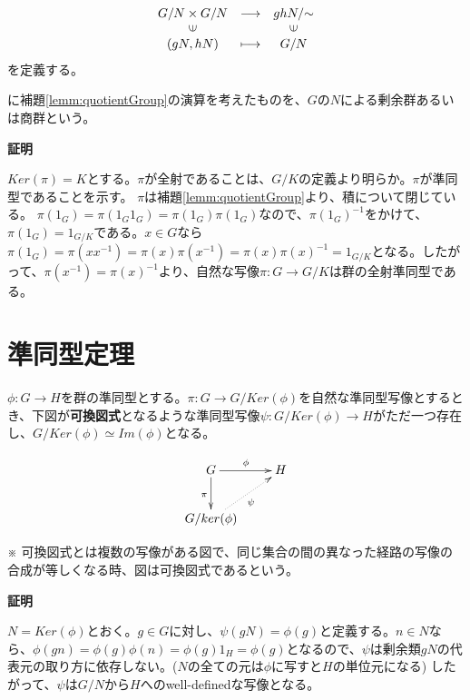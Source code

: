 \documentclass[dvipdfmx,autodetect-engine]{jsarticle}
\begin{document}
$$
\begin{array}{ccc}
G/N \times G/N & {\longrightarrow} & ghN/{\sim} \\
\rotatebox{90}{$\in$} & & \rotatebox{90}{$\in$} \\
(gN, hN) & \longmapsto & G/N
\end{array}
$$
を定義する。

に補題\ref{lemm:quotientGroup}の演算を考えたものを、$G$の$N$による剰余群あるいは商群という。

\label{prop:wellDefinedHom}

{\bf 証明}

$Ker(\pi) = K$とする。$\pi$が全射であることは、$G/K$の定義より明らか。$\pi$が準同型であることを示す。
$\pi$は補題\ref{lemm:quotientGroup}より、積について閉じている。 $\pi(1_G) = \pi(1_G1_G) = \pi(1_G)\pi(1_G)$なので、$\pi(1_G)^{-1}$をかけて、$\pi(1_G) = 1_{G/K}$である。$x \in G$なら$\pi(1_G) = \pi(xx^{-1}) = \pi(x)\pi(x^{-1}) = \pi(x)\pi(x)^{-1} = 1_{G/K}$となる。したがって、$\pi(x^{-1}) = \pi(x)^{-1}$より、自然な写像$\pi: G \to G/K$は群の全射準同型である。

\section{準同型定理}


$\phi: G \to H$を群の準同型とする。$\pi: G \to G/Ker(\phi)$を自然な準同型写像とするとき、下図が{\bf 可換図式}となるような準同型写像$\psi: G/Ker(\phi) \to H$がただ一つ存在し、$G/Ker(\phi) \simeq Im(\phi)$となる。

\[
\xymatrix{
G \ar[r]^{\phi} \ar[d]_{\pi} & H \\
G/ker(\phi) \ar@{.>}[ru]_{\psi}
}
\]

※ 可換図式とは複数の写像がある図で、同じ集合の間の異なった経路の写像の合成が等しくなる時、図は可換図式であるという。

{\bf 証明}


$N = Ker(\phi)$とおく。$g \in G$に対し、$\psi(gN) = \phi(g)$と定義する。$n \in N$なら、$\phi(gn) = \phi(g)\phi(n) = \phi(g)1_H = \phi(g)$となるので、$\psi$は剰余類$gN$の代表元の取り方に依存しない。($N$の全ての元は$\phi$に写すと$H$の単位元になる)
したがって、$\psi$は$G/N$から$H$へのwell-definedな写像となる。
\end{document}
